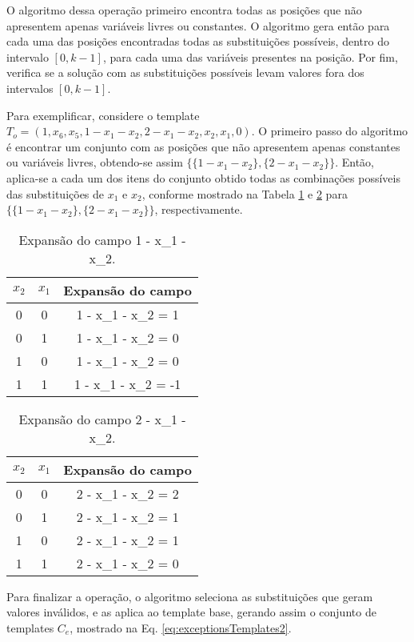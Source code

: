 O algoritmo dessa operação primeiro encontra todas as posições que não apresentem apenas variáveis livres ou constantes. O algoritmo gera então para cada uma das posições encontradas todas as substituições possíveis, dentro do intervalo $[0,k-1]$, para cada uma das variáveis presentes na posição. Por fim, verifica se a solução com as substituições possíveis levam valores fora dos intervalos $[0,k-1]$.

Para exemplificar, considere o template $T_{o} = (1, x_6, x_5, 1 - x_1 - x_2, 2 - x_1 - x_2, x_2, x_1, 0)$. O primeiro passo do algoritmo é encontrar um conjunto com as posições que não apresentem apenas constantes ou variáveis livres, obtendo-se assim $\{\{1 - x_1 - x_2\}, \{2 - x_1 - x_2\}\}$. Então, aplica-se a cada um dos itens do conjunto obtido todas as combinações possíveis das substituições de $x_1$ e $x_2$, conforme mostrado na Tabela \ref{tab:exceptionProcessA} e \ref{tab:exceptionProcessB} para $\{\{1 - x_1 - x_2\}, \{2 - x_1 - x_2\}\}$, respectivamente.
\begin{table}[h!]
\centering
\caption{Expansão do campo 1 - x_1 - x_2.}
	\begin{tabular}{ccc}
    \toprule
	$x_2$ & $x_1$ & Expansão do campo \\
    \midrule
	0	&	0	&	1 - x_1 - x_2 = 1	\\
	0	&	1	&	1 - x_1 - x_2 = 0	\\
	1	&	0	&	1 - x_1 - x_2 = 0	\\
	1	&	1	&	1 - x_1 - x_2 = -1	\\
    \bottomrule
	\end{tabular}
\label{tab:exceptionProcessA}
\end{table} 

\begin{table}[h!]
\centering
\caption{Expansão do campo 2 - x_1 - x_2.}
	\begin{tabular}{ccc}
    \toprule
	$x_2$ & $x_1$ & Expansão do campo \\
    \midrule
	0	&	0	&	2 - x_1 - x_2 = 2	\\
	0	&	1	&	2 - x_1 - x_2 = 1	\\
	1	&	0	&	2 - x_1 - x_2 = 1	\\
	1	&	1	&	2 - x_1 - x_2 = 0	\\
    \bottomrule
	\end{tabular}
\label{tab:exceptionProcessB}
\end{table}

Para finalizar a operação, o algoritmo seleciona as substituições que geram valores inválidos, e as aplica ao template base, gerando assim o conjunto de templates $C_e$, mostrado na  Eq. \ref{eq:exceptionsTemplates2}.

